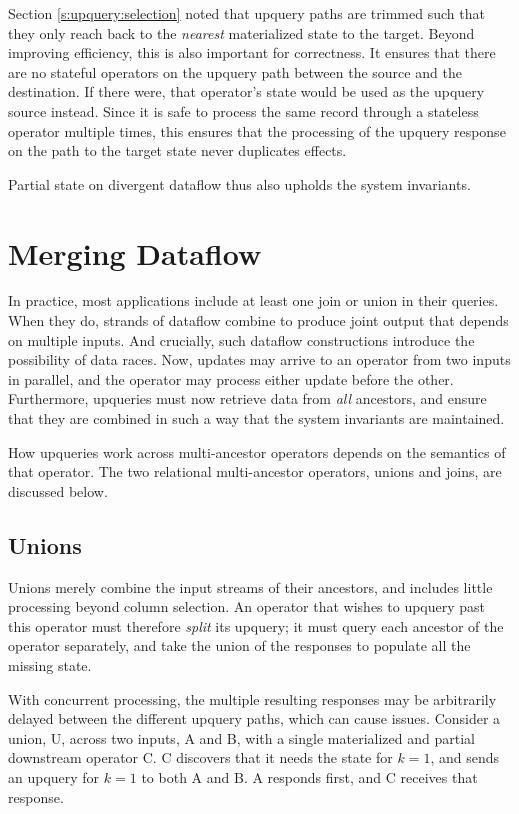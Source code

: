 Section \ref{s:upquery:selection} noted that upquery paths are trimmed such that
they only reach back to the \emph{nearest} materialized state to the target.
Beyond improving efficiency, this is also important for correctness. It ensures
that there are no stateful operators on the upquery path between the source and
the destination. If there were, that operator's state would be used as the
upquery source instead. Since it is safe to process the same record through a
stateless operator multiple times, this ensures that the processing of the
upquery response on the path to the target state never duplicates effects.

Partial state on divergent dataflow thus also upholds the system invariants.

\section{Merging Dataflow}
\label{s:partial:merging}

In practice, most applications include at least one join or union in their
queries. When they do, strands of dataflow combine to produce joint output that
depends on multiple inputs. And crucially, such dataflow constructions introduce
the possibility of data races. Now, updates may arrive to an operator from two
inputs in parallel, and the operator may process either update before the other.
Furthermore, upqueries must now retrieve data from \emph{all} ancestors, and
ensure that they are combined in such a way that the system invariants are
maintained.

How upqueries work across multi-ancestor operators depends on the semantics of
that operator. The two relational multi-ancestor operators, unions and joins,
are discussed below.

\subsection{Unions}
\label{s:upqueries:union}

Unions merely combine the input streams of their ancestors, and includes little
processing beyond column selection. An operator that wishes to upquery past this
operator must therefore \emph{split} its upquery; it must query each ancestor of
the operator separately, and take the union of the responses to populate all the
missing state.

With concurrent processing, the multiple resulting responses may be arbitrarily
delayed between the different upquery paths, which can cause issues. Consider
a union, U, across two inputs, A and B, with a single materialized and partial
downstream operator C. C discovers that it needs the state for $k = 1$, and
sends an upquery for $k = 1$ to both A and B. A responds first, and C receives
that response.

